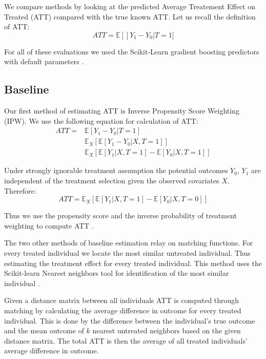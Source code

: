 \documentclass{article}
\begin{document}
We compare methods by looking at the predicted Average Treatement Effect on Treated (ATT) compared with the true known ATT. Let us recall the definition of ATT:
\begin{equation*}
    ATT = \mathbb{E}[]Y_1 - Y_0 | T=1]
\end{equation*}

For all of these evaluations we used the Scikit-Learn gradient boosting predictors with default parameters \cite{scikit-learn}. 

\subsection{Baseline}
Our first method of estimating ATT is Inverse Propensity Score Weighting (IPW).
We use the following equation for calculation of ATT:
\begin{equation*}
    \begin{split}
        ATT = & \mathbb{E}[Y_1 - Y_0 | T=1] \\
        & \mathbb{E}_X[\mathbb{E}[Y_1 - Y_0 | X, T=1]] \\
        & \mathbb{E}_X[\mathbb{E}[Y_1 | X, T=1] - \mathbb{E}[Y_0 | X, T=1]]
    \end{split}
\end{equation*}

Under strongly ignorable treatment assumption the potential outcomes $Y_0$, $Y_1$ are independent of the treatment selection given the observed covariates $X$. Therefore:
\begin{equation*}
    ATT = \mathbb{E}_X[\mathbb{E}[Y_1|X, T=1] - \mathbb{E}[Y_0 | X, T=0]]
\end{equation*}

Thus we use the propensity score and the inverse probability of treatment weighting to compute ATT \cite{abdia2017propensity}. 

The two other methods of baseline estimation relay on matching functions. For every treated individual we locate the most similar untreated individual. Thus estimating the treatment effect for every treated individual. This method uses the Scikit-learn Nearest neighbors tool for identification of the most similar individual \cite{scikit-learn}. 

Given a distance matrix between all individuals ATT is computed through matching by calculating the average difference in outcome for every treated individual. This is done by the difference between the individual's true outcome and the mean outcome of $k$ nearest untreated neighbors based on the given distance matrix. The total ATT is then the average of all treated individuals' average difference in outcome.
\end{document}
